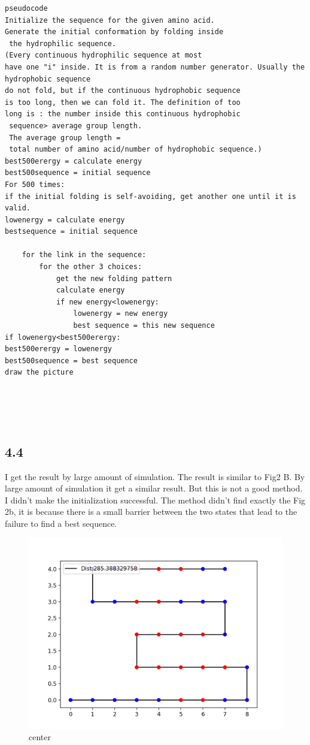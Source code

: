\documentclass[12pt]{article}
\begin{document}
\begin{lstlisting}
pseudocode
Initialize the sequence for the given amino acid.
Generate the initial conformation by folding inside
 the hydrophilic sequence. 
(Every continuous hydrophilic sequence at most 
have one "i" inside. It is from a random number generator. Usually the hydrophobic sequence 
do not fold, but if the continuous hydrophobic sequence 
is too long, then we can fold it. The definition of too 
long is : the number inside this continuous hydrophobic
 sequence> average group length. 
 The average group length = 
 total number of amino acid/number of hydrophobic sequence.)
best500erergy = calculate energy
best500sequence = initial sequence
For 500 times:
if the initial folding is self-avoiding, get another one until it is valid.
lowenergy = calculate energy
bestsequence = initial sequence

	for the link in the sequence:
		for the other 3 choices:
			get the new folding pattern
			calculate energy
			if new energy<lowenergy:
				lowenergy = new energy
				best sequence = this new sequence
if lowenergy<best500erergy:
best500erergy = lowenergy
best500sequence = best sequence		
draw the picture
				
			



\end{lstlisting}
\subsection{4.4}
I get the result by large amount of simulation. 
The result is similar to Fig2 B. By large amount of simulation it get a similar result. But this is not a good method. I didn't make the initialization successful. The method didn't find exactly the Fig 2b, it is because there is a small barrier between the two states that lead to the failure to find a best sequence.\begin{figure}[H]
  \caption{center}
  \centering
    \includegraphics[scale=0.5]{figure_1.png}
\end{figure}
\end{document}
